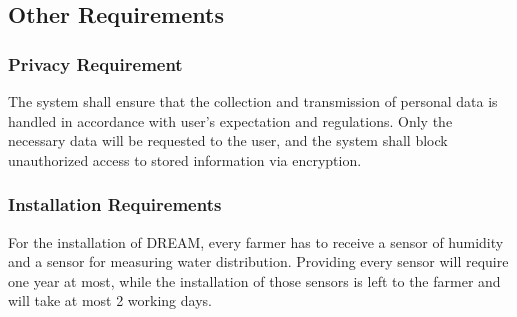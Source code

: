 \subsection{Other Requirements}
\subsubsection{Privacy Requirement}
The system shall ensure that the collection and transmission of personal data is handled in accordance with user’s expectation and regulations.
Only the necessary data will be requested to the user, and the system shall block unauthorized access to stored information via encryption.
\subsubsection{Installation Requirements}
For the installation of DREAM, every farmer has to receive a sensor of humidity and a sensor for measuring water distribution. Providing every sensor will require one year at most, while the installation of those sensors is left to the farmer and will take at most 2 working days.